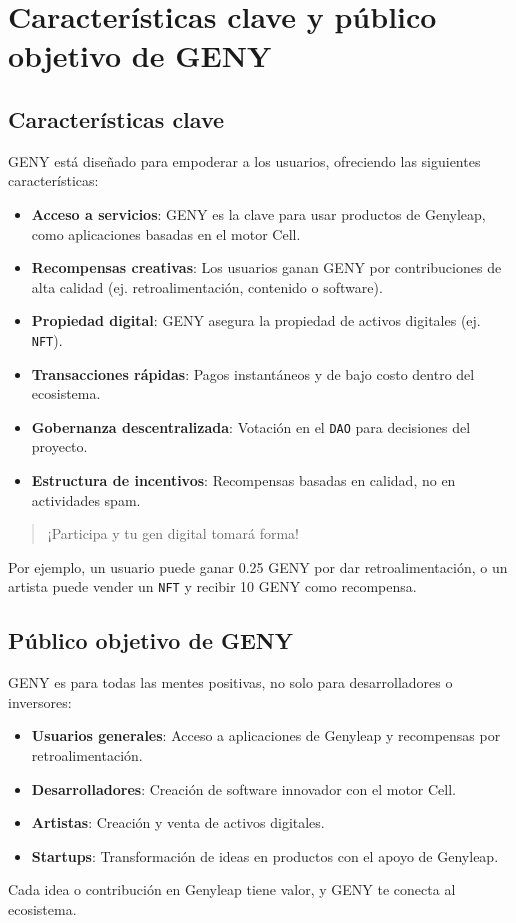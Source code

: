 \documentclass[a4paper,12pt,openany]{book}
\begin{document}
\section*{Características clave y público objetivo de GENY}
\subsection*{Características clave}
GENY está diseñado para empoderar a los usuarios, ofreciendo las siguientes características:
\begin{itemize}
    \item \textbf{Acceso a servicios}: GENY es la clave para usar productos de Genyleap, como aplicaciones basadas en el motor Cell.
    \item \textbf{Recompensas creativas}: Los usuarios ganan GENY por contribuciones de alta calidad (ej. retroalimentación, contenido o software).
    \item \textbf{Propiedad digital}: GENY asegura la propiedad de activos digitales (ej. \texttt{NFT}).
    \item \textbf{Transacciones rápidas}: Pagos instantáneos y de bajo costo dentro del ecosistema.
    \item \textbf{Gobernanza descentralizada}: Votación en el \texttt{DAO} para decisiones del proyecto.
    \item \textbf{Estructura de incentivos}: Recompensas basadas en calidad, no en actividades spam.
\end{itemize}
\begin{quote}
¡Participa y tu gen digital tomará forma!
\end{quote}
Por ejemplo, un usuario puede ganar 0.25 GENY por dar retroalimentación, o un artista puede vender un \texttt{NFT} y recibir 10 GENY como recompensa.

\subsection*{Público objetivo de GENY}
GENY es para todas las mentes positivas, no solo para desarrolladores o inversores:
\begin{itemize}
    \item \textbf{Usuarios generales}: Acceso a aplicaciones de Genyleap y recompensas por retroalimentación.
    \item \textbf{Desarrolladores}: Creación de software innovador con el motor Cell.
    \item \textbf{Artistas}: Creación y venta de activos digitales.
    \item \textbf{Startups}: Transformación de ideas en productos con el apoyo de Genyleap.
\end{itemize}
Cada idea o contribución en Genyleap tiene valor, y GENY te conecta al ecosistema.
\newpage
\end{document}
